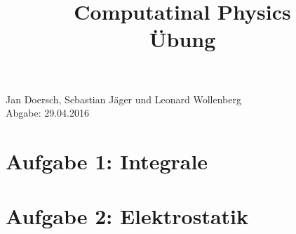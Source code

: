 \documentclass[a4paper, 12pt]{article}
\begin{document}
\title{
\textbf{Computatinal Physics\\
Übung}
}
\date{}
\maketitle

\begin{center}
Jan Doersch, Sebastian Jäger und Leonard Wollenberg\\
Abgabe: 29.04.2016\\
\end{center}
\section*{Aufgabe 1: Integrale}




\newpage
\section*{Aufgabe 2: Elektrostatik}

\end{document}
